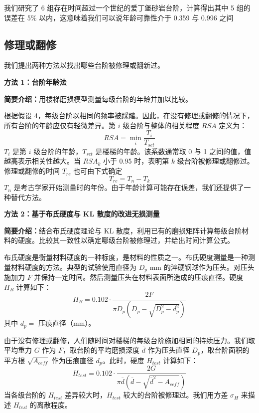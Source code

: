 \documentclass[11pt,a4paper]{ctexart}
\begin{document}
我们研究了 6 组存在时间超过一个世纪的爱丁堡砂岩台阶，计算得出其中 5 组的误差在 5\% 以内，这意味着我们可以说年龄可靠性介于 0.359 与 0.996 之间

\subsection{修理或翻修}

我们提出两种方法以找出哪些台阶被修理或翻新过。

\textbf{方法 1：台阶年龄法}

\textbf{简要介绍：}用楼梯磨损模型测量每级台阶的年龄并加以比较。

根据假设 4，每级台阶以相同的频率被踩踏。因此，在没有修理或翻修的情况下，所有台阶的年龄应仅有轻微差异。第 \(i\) 级台阶与整体的相关程度 \(RSA\) 定义为：
\begin{equation}
RSA=\min_i\frac{T_i}{T_{set}} \tag{4.5}
\end{equation}
\(T_i\) 是第 \(i\) 级台阶的年龄，\(T_{set}\) 是楼梯的年龄。该系数通常取 0 与 1 之间的值，值越高表示相关性越大。当 \(RSA_k\) 小于 0.95 时，表明第 \(k\) 级台阶被修理或翻修过。修理或翻修的时间 \(T_{re}\) 也可由下式确定
\begin{equation}
T_{re}=T_n-T_k \tag{4.6}
\end{equation}
\(T_n\) 是考古学家开始测量时的年份。由于年龄计算可能存在误差，我们还提供了一种替代方法。

\textbf{方法 2：基于布氏硬度与 KL 散度的改进无损测量}

\textbf{简要介绍：}结合布氏硬度理论与 KL 散度，利用已有的磨损矩阵计算每级台阶材料的硬度。比较其一致性以确定哪级台阶被修理过，并给出时间计算公式。

布氏硬度是衡量材料硬度的一种标度，是材料的性质之一。布氏硬度测量是一种测量材料硬度的方法。典型的试验使用直径为 \(D_p\) mm 的淬硬钢球作为压头。对压头施加力 \(F\) 并保持一定时间。然后测量压头在材料表面所造成的压痕直径。硬度 \(H_B\) 计算如下：
\begin{equation}
H_B=0.102\cdot\frac{2F}{\pi D_p\left(D_p-\sqrt{D_p^2-d_p^2}\right)} \tag{4.7}
\end{equation}
其中 \(d_p=\) 压痕直径（mm）。

由于没有修理或翻修，人们随时间对楼梯的每级台阶施加相同的持续压力。我们取平均重力 \(G\) 作为 \(F\)，取台阶的平均磨损深度 \(\bar{d}\) 作为压头直径 \(D_p\)，取台阶面积的平方根 \(\sqrt{A_{ceff}}\) 作为压痕直径 \(d_p\)。此时，硬度 \(H_{test}\) 计算如下：
\begin{equation}
H_{test}=0.102\cdot\frac{2G}{\pi\bar{d}\left(\bar{d}-\sqrt{\bar{d}^2-A_{ceff}}\right)} \tag{4.8}
\end{equation}
当各级台阶的 \(H_{test}\) 差异较大时，\(H_{test}\) 较大的台阶被修理过。我们用方差 \(\sigma_H\) 来描述 \(H_{test}\) 的离散程度。
\end{document}
